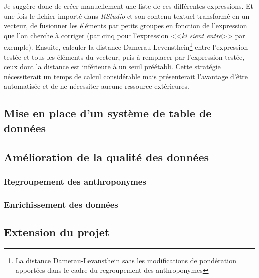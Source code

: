 Je suggère donc de créer manuellement une liste de ces différentes expressions. Et une fois le fichier importé dans \textit{RStudio} et son contenu textuel transformé en un vecteur, de fusionner les éléments par petits groupes en fonction de l'expression que l'on cherche à corriger (par cinq pour l'expression <<\textit{ki sient entre}>> par exemple). 
Ensuite, calculer la distance Damerau-Levensthein\footnote{La distance Damerau-Levansthein sans les modifications de pondération apportées dans le cadre du regroupement des anthroponymes} entre l'expression testée et tous les éléments du vecteur, puis à remplacer par l'expression testée, ceux dont la distance est inférieure à un seuil préétabli. %
Cette stratégie nécessiterait un temps de calcul considérable mais présenterait l'avantage d'être automatisée et de ne nécessiter aucune ressource extérieures.

\subsection{Mise en place d'un système de table de données}
\subsection{Amélioration de la qualité des données}
\subsubsection{Regroupement des anthroponymes}
\subsubsection{Enrichissement des  données}
\subsection{Extension du projet}
